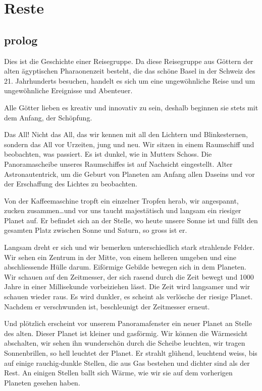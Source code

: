 \documentclass[11pt,titlepage,a5paper]{book}
\begin{document}
\chapter*{Reste}

\section*{prolog}

Dies ist die Geschichte einer Reisegruppe. Da diese Reisegruppe aus Göttern der alten ägyptischen Pharaonenzeit besteht, die das schöne Basel in der Schweiz des 21. Jahrhunderts besuchen, handelt es sich um eine ungewöhnliche Reise und um ungewöhnliche Ereignisse und Abenteuer. 

Alle Götter lieben es kreativ und innovativ zu sein, deshalb beginnen sie stets mit dem Anfang, der Schöpfung. 

Das All!  Nicht das All, das wir kennen mit all den Lichtern und Blinkesternen, sondern das All vor Urzeiten, jung und neu. Wir sitzen in einem Raumschiff und beobachten, was passiert. Es ist dunkel, wie in Mutters Schoss. Die Panoramascheibe unseres Raumschiffes ist auf Nachsicht eingestellt. Alter Astronautentrick, um die Geburt von Planeten am Anfang allen Daseins und vor der Erschaffung des Lichtes zu beobachten.

Von der Kaffeemaschine tropft ein einzelner Tropfen herab, wir angespannt, zucken zusammen\dots und vor uns taucht majestätisch und langsam ein riesiger Planet auf. Er befindet sich an der Stelle, wo heute unsere Sonne ist und füllt den gesamten Platz zwischen Sonne und Saturn, so gross ist er. 

Langsam dreht er sich und wir bemerken unterschiedlich stark strahlende Felder. Wir sehen ein Zentrum in der Mitte, von einem helleren umgeben und eine abschliessende Hülle darum. Eiförmige Gebilde  bewegen sich in dem Planeten. Wir schauen auf den Zeitmesser, der sich rasend durch die Zeit bewegt und 1000 Jahre in einer Millisekunde vorbeiziehen lässt. Die Zeit wird langsamer und wir schauen wieder raus. Es wird dunkler, es scheint als verlösche der riesige Planet. Nachdem er verschwunden ist, beschleunigt der Zeitmesser erneut. 

Und plötzlich erscheint vor unserem Panoramafenster ein neuer Planet an Stelle des alten. Dieser Planet ist kleiner und gasförmig. Wir können die Wärmesicht abschalten, wir sehen ihn wunderschön durch die Scheibe leuchten, wir tragen Sonnenbrillen, so hell leuchtet der Planet. Er strahlt glühend, leuchtend weiss, bis auf einige rauchig-dunkle Stellen, die aus Gas bestehen und dichter sind als der Rest. An einigen Stellen ballt sich Wärme, wie wir sie auf dem vorherigen Planeten gesehen haben.
\end{document}
